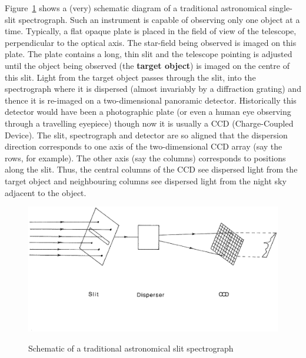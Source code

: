 \documentclass[twoside,11pt]{article}
\begin{document}
Figure~\ref{SLITSPR1} shows a (very) schematic diagram of a traditional
astronomical single-slit spectrograph.  Such an instrument is capable of
observing only one object at a time.  Typically, a flat opaque plate is
placed in the field of view of the telescope, perpendicular to the optical
axis.  The star-field being observed is imaged on this plate.  The plate
contains a long, thin slit and the telescope pointing is adjusted until
the object being observed (the {\bf target object}) is imaged on the
centre of this slit.  Light from the target object passes through the
slit, into the spectrograph where it is dispersed (almost invariably by
a diffraction grating) and thence it is re-imaged on a two-dimensional
panoramic detector.  Historically this detector would have been a
photographic plate (or even a human eye observing through a travelling
eyepiece) though now it is usually a CCD (Charge-Coupled Device).  The
slit, spectrograph and detector are so aligned that the dispersion
direction corresponds to one axis of the two-dimensional CCD array
(say the rows, for example).  The other axis (say the columns)
corresponds to positions along the slit.  Thus, the central columns
of the CCD see dispersed light from the target object and neighbouring
columns see dispersed light from the night sky adjacent to the object.

\begin{figure}[htbp]
   \centering 
   \includegraphics[totalheight=4in]{sc14_spectrograph.ps}
   \begin{quote}
   \caption{Schematic of a traditional astronomical slit spectrograph
   \label{SLITSPR1} }
   \end{quote}
\end{figure}
\end{document}
